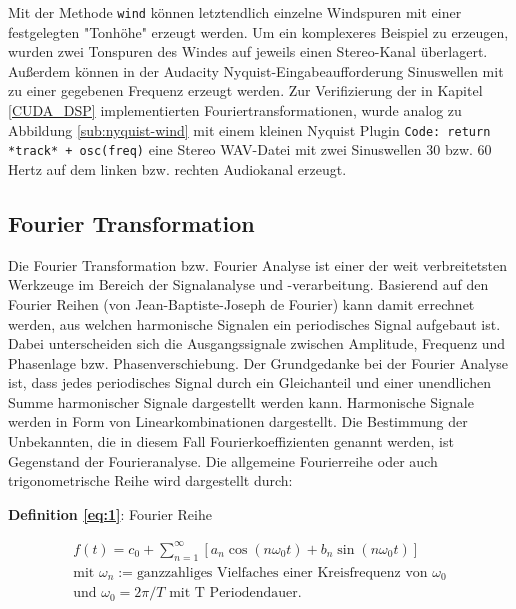 Mit der Methode \texttt{wind} können letztendlich einzelne Windspuren mit einer festgelegten "Tonhöhe" erzeugt werden. Um ein komplexeres Beispiel zu erzeugen, wurden zwei Tonspuren des Windes auf jeweils einen Stereo-Kanal überlagert.
Außerdem können in der Audacity Nyquist-Eingabeaufforderung Sinuswellen mit zu einer gegebenen Frequenz erzeugt werden. Zur Verifizierung der in Kapitel \ref{CUDA_DSP} implementierten Fouriertransformationen, wurde analog zu Abbildung  \ref{sub:nyquist-wind} mit einem kleinen Nyquist Plugin \texttt{Code: return *track* + osc(freq)} eine Stereo WAV-Datei mit zwei Sinuswellen 30 bzw. 60 Hertz auf dem linken bzw. rechten Audiokanal erzeugt.

\subsection{Fourier Transformation}

Die Fourier Transformation bzw. Fourier Analyse ist  einer der weit verbreitetsten Werkzeuge im Bereich der Signalanalyse und -verarbeitung. Basierend auf den Fourier Reihen (von Jean-Baptiste-Joseph de Fourier) kann damit errechnet werden, aus welchen harmonische Signalen ein periodisches Signal aufgebaut ist. Dabei unterscheiden sich die Ausgangssignale zwischen Amplitude, Frequenz und Phasenlage bzw. Phasenverschiebung. Der Grundgedanke bei der Fourier Analyse ist, dass jedes periodisches Signal durch ein Gleichanteil und einer unendlichen Summe harmonischer Signale dargestellt werden kann. Harmonische Signale werden in Form von Linearkombinationen dargestellt. Die Bestimmung der Unbekannten, die in diesem Fall Fourierkoeffizienten genannt werden, ist Gegenstand der Fourieranalyse. Die allgemeine Fourierreihe oder auch trigonometrische Reihe wird dargestellt durch:


\begin{flushleft}
	\textbf{Definition \eqref{eq:1}}: Fourier Reihe
\end{flushleft}
\vspace{\baselineskip}
\begin{equation}
	\begin{gathered}
	f(t) = c_{0} + \sum_{n=1}^{\infty} \left [ a_{n} \cos(n\omega_{0}t) + b_{n} \sin(n\omega_{0}t) \right ] \\ \text{mit }  \omega_{n} := \text{ganzzahliges Vielfaches einer Kreisfrequenz von } \omega_{0} \\
		\text{und } \omega_{0} = 2 \pi / T \text{ mit T Periodendauer.}
	\end{gathered}\label{eq:1}
\end{equation}
